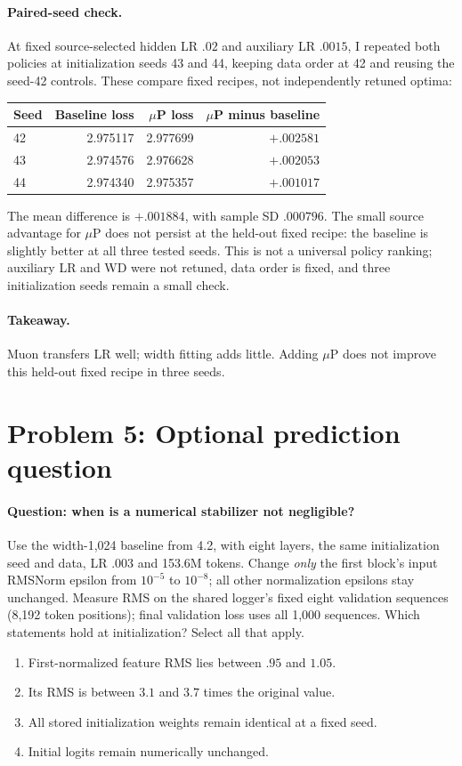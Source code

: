 \documentclass{article}
\begin{document}
\paragraph{Paired-seed check.} At fixed source-selected hidden LR $.02$
and auxiliary LR $.0015$, I repeated both policies at initialization seeds
43 and 44, keeping data order at 42 and reusing the seed-42 controls.
These compare fixed recipes, not independently retuned optima:
\begin{center}
\begin{tabular}{lrrr}
\toprule
Seed & Baseline loss & $\mu$P loss & $\mu$P minus baseline \\
\midrule
42 & 2.975117 & 2.977699 & $+.002581$ \\
43 & 2.974576 & 2.976628 & $+.002053$ \\
44 & 2.974340 & 2.975357 & $+.001017$ \\
\bottomrule
\end{tabular}
\end{center}
The mean difference is $+.001884$, with sample SD $.000796$.
The small source advantage for $\mu$P does not persist at the held-out
fixed recipe: the baseline is slightly better at all three tested seeds.
This is not a universal policy ranking; auxiliary LR and WD were not
retuned, data order is fixed, and three initialization seeds remain a
small check.

\paragraph{Takeaway.} Muon transfers LR well; width fitting adds little.
Adding $\mu$P does not improve this held-out fixed recipe in three seeds.

\section{Problem 5: Optional prediction question}
\label{sec:p5-norm}

\paragraph{Question: when is a numerical stabilizer not negligible?}
Use the width-1,024 baseline from 4.2, with eight layers, the same
initialization seed and data, LR $.003$ and 153.6M tokens. Change
\emph{only} the first block's input RMSNorm epsilon from $10^{-5}$ to
$10^{-8}$; all other normalization epsilons stay unchanged.
Measure RMS on the shared logger's fixed eight validation sequences
(8,192 token positions); final validation loss uses all 1,000 sequences.
Which statements hold at initialization? Select all that apply.
\begin{enumerate}
\item[A.] First-normalized feature RMS lies between $.95$ and $1.05$.
\item[B.] Its RMS is between $3.1$ and $3.7$ times the original value.
\item[C.] All stored initialization weights remain identical at a fixed seed.
\item[D.] Initial logits remain numerically unchanged.
\end{enumerate}
\end{document}

